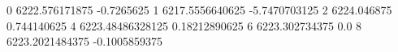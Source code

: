 0 6222.576171875 -0.7265625
1 6217.5556640625 -5.7470703125
2 6224.046875 0.744140625
4 6223.48486328125 0.18212890625
6 6223.302734375 0.0
8 6223.2021484375 -0.1005859375
